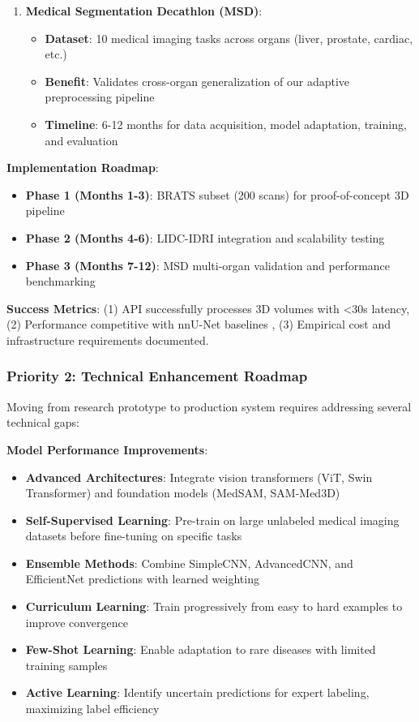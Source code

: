 \documentclass[12pt,a4paper]{article}
\begin{document}
\begin{enumerate}
    \item \textbf{Medical Segmentation Decathlon (MSD)}:
    \begin{itemize}
        \item \textbf{Dataset}: 10 medical imaging tasks across organs (liver, prostate, cardiac, etc.)
        \item \textbf{Benefit}: Validates cross-organ generalization of our adaptive preprocessing pipeline
        \item \textbf{Timeline}: 6-12 months for data acquisition, model adaptation, training, and evaluation
    \end{itemize}
\end{enumerate}

\textbf{Implementation Roadmap}:
\begin{itemize}
    \item \textbf{Phase 1 (Months 1-3)}: BRATS subset (200 scans) for proof-of-concept 3D pipeline
    \item \textbf{Phase 2 (Months 4-6)}: LIDC-IDRI integration and scalability testing
    \item \textbf{Phase 3 (Months 7-12)}: MSD multi-organ validation and performance benchmarking
\end{itemize}

\textbf{Success Metrics}: (1) API successfully processes 3D volumes with <30s latency, (2) Performance competitive with nnU-Net baselines \cite{isensee2021nnunet}, (3) Empirical cost and infrastructure requirements documented.

\subsubsection{Priority 2: Technical Enhancement Roadmap}

Moving from research prototype to production system requires addressing several technical gaps:

\textbf{Model Performance Improvements}:
\begin{itemize}
    \item \textbf{Advanced Architectures}: Integrate vision transformers (ViT, Swin Transformer) and foundation models (MedSAM, SAM-Med3D)
    \item \textbf{Self-Supervised Learning}: Pre-train on large unlabeled medical imaging datasets before fine-tuning on specific tasks
    \item \textbf{Ensemble Methods}: Combine SimpleCNN, AdvancedCNN, and EfficientNet predictions with learned weighting
    \item \textbf{Curriculum Learning}: Train progressively from easy to hard examples to improve convergence
    \item \textbf{Few-Shot Learning}: Enable adaptation to rare diseases with limited training samples
    \item \textbf{Active Learning}: Identify uncertain predictions for expert labeling, maximizing label efficiency
\end{itemize}
\end{document}
